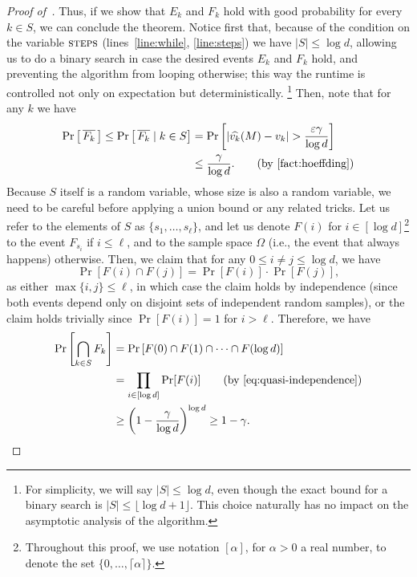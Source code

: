 \begin{proof}[Proof of~]
Thus, if we show that $E_k$ and $F_k$ hold with good probability for every $k \in S$, we can conclude the theorem.
Notice first that, because of the condition on the variable $\textsc{steps}$ (lines~\ref{line:while}, \ref{line:steps}) we have $|S| \leq \log d$, allowing us to do a binary search in case the desired events $E_k$ and $F_k$ hold, and preventing the algorithm from looping otherwise; this way the runtime is controlled not only on expectation but deterministically. \footnote{For simplicity, we will say $|S| \leq \log d$, even though the exact bound for a binary search is $|S| \leq \lfloor \log d  + 1 \rfloor$. This choice naturally has no impact on the asymptotic analysis of the algorithm.} Then, note that for any $k$ we have
\begin{align*}
	\Pr\left[ \, \overline{F_k} \,\right] \leq \Pr\left[ \, \overline{F_k} \mid k \in S \right] &= \Pr\left[|\widehat{v_k}(M) - v_k| > \frac{\varepsilon \gamma}{\log d}\right]\\
	&\leq \frac{\gamma}{\log d}. \tag{by~\Cref{fact:hoeffding}}
\end{align*}
Because $S$ itself is a random variable, whose size is also a random variable, we need to be careful before applying a union bound or any related tricks. Let us refer to the elements of $S$ as $\{s_1, \ldots, s_\ell\}$, and let us denote $F(i)$ for $i \in [\log d]$\footnote{Throughout this proof, we use notation $[\alpha]$, for $\alpha > 0$ a real number, to denote the set $\{0, \ldots, \lceil \alpha \rceil\}$.} to the event $F_{s_i}$ if $i \leq \ell$, and to the sample space $\Omega$ (i.e., the event that always happens) otherwise. Then, we claim that for any $0 \leq i \neq j \leq \log d$, we have 
\begin{equation}\label{eq:quasi-independence}
	\Pr[F(i) \cap F(j)] = \Pr[F(i)] \cdot \Pr[F(j)],
\end{equation}
as either $\max \{i, j\} \leq \ell$, in which case the claim holds by independence (since both events depend only on disjoint sets of independent random samples), or the claim holds trivially since $\Pr[F(i)] = 1$ for $i > \ell$.
Therefore, we have 
\begin{align*}
\Pr\left[\bigcap_{k \in S} F_k\right] &= \Pr\left[F(0) \cap F(1) \cap \cdots \cap F(\log d)\right]\\
&= \prod_{i \in [\log d]} \Pr[F(i)]\tag{by~\Cref{eq:quasi-independence}}\\
&\geq \left(1 - \frac{\gamma}{\log d}\right)^{\log d} \geq 1 - \gamma.
\end{align*}

\end{proof}
